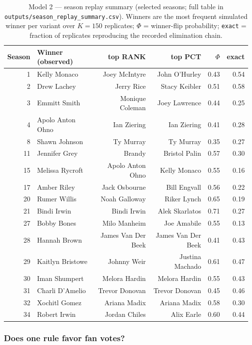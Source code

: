 \documentclass[11pt]{article}
\begin{document}
\begin{table}[H]
\centering
\small
\caption{Model 2 --- season replay summary (selected seasons; full table in
\texttt{outputs/season\_replay\_summary.csv}). Winners are the most frequent simulated
winner per variant over $K=150$ replicates; $\Phi$ = winner-flip probability;
\texttt{exact} = fraction of replicates reproducing the recorded elimination chain.}
\label{tab:replay}
\begin{tabular}{rlrrrr}
\toprule
Season & Winner (observed) & top RANK & top PCT & $\Phi$ & exact \\
\midrule
1 & Kelly Monaco & Joey McIntyre & John O'Hurley & 0.43 & 0.54 \\
2 & Drew Lachey & Jerry Rice & Stacy Keibler & 0.51 & 0.58 \\
3 & Emmitt Smith & Monique Coleman & Joey Lawrence & 0.44 & 0.25 \\
4 & Apolo Anton Ohno & Ian Ziering & Ian Ziering & 0.41 & 0.28 \\
8 & Shawn Johnson & Ty Murray & Ty Murray & 0.35 & 0.27 \\
11 & Jennifer Grey & Brandy & Bristol Palin & 0.57 & 0.30 \\
15 & Melissa Rycroft & Apolo Anton Ohno & Kelly Monaco & 0.55 & 0.16 \\
17 & Amber Riley & Jack Osbourne & Bill Engvall & 0.56 & 0.22 \\
20 & Rumer Willis & Noah Galloway & Riker Lynch & 0.65 & 0.19 \\
21 & Bindi Irwin & Bindi Irwin & Alek Skarlatos & 0.71 & 0.27 \\
27 & Bobby Bones & Milo Manheim & Joe Amabile & 0.55 & 0.13 \\
28 & Hannah Brown & James Van Der Beek & James Van Der Beek & 0.41 & 0.43 \\
29 & Kaitlyn Bristowe & Johnny Weir & Justina Machado & 0.61 & 0.47 \\
30 & Iman Shumpert & Melora Hardin & Melora Hardin & 0.55 & 0.43 \\
31 & Charli D'Amelio & Trevor Donovan & Trevor Donovan & 0.45 & 0.46 \\
32 & Xochitl Gomez & Ariana Madix & Ariana Madix & 0.58 & 0.30 \\
34 & Robert Irwin & Jordan Chiles & Alix Earle & 0.60 & 0.44 \\
\bottomrule
\end{tabular}
\end{table}

\subsubsection{Does one rule favor fan votes?}
\end{document}
